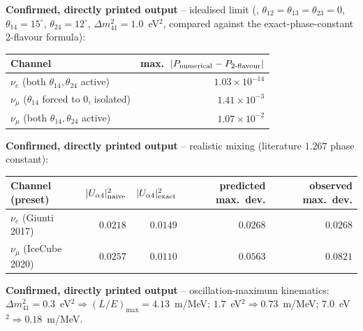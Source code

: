 \begin{resultbox}
\textbf{Confirmed, directly printed output} -- idealised limit
(, $\theta_{12}=\theta_{13}=\theta_{23}=0$,
$\theta_{14}=15^\circ$, $\theta_{24}=12^\circ$, $\Delta m^2_{41}=1.0$~eV$^2$,
compared against the exact-phase-constant 2-flavour formula):
\begin{center}
\small
\begin{tabular}{@{}lr@{}}
\toprule
Channel & max.\ $|P_{\rm numerical}-P_{\rm 2\text{-}flavour}|$ \\
\midrule
$\nu_e$ (both $\theta_{14},\theta_{24}$ active) & $1.03\times10^{-14}$ \\
$\nu_\mu$ ($\theta_{14}$ forced to $0$, isolated) & $1.41\times10^{-3}$ \\
$\nu_\mu$ (both $\theta_{14},\theta_{24}$ active) & $1.07\times10^{-2}$ \\
\bottomrule
\end{tabular}
\end{center}

\textbf{Confirmed, directly printed output} -- realistic mixing (literature
$1.267$ phase constant):
\begin{center}
\small
\begin{tabular}{@{}lrrrr@{}}
\toprule
Channel (preset) & $|U_{\alpha4}|^2_{\rm naive}$ & $|U_{\alpha4}|^2_{\rm exact}$ & predicted max.\ dev. & observed max.\ dev. \\
\midrule
$\nu_e$ (Giunti 2017) & $0.0218$ & $0.0149$ & $0.0268$ & $0.0268$ \\
$\nu_\mu$ (IceCube 2020) & $0.0257$ & $0.0110$ & $0.0563$ & $0.0821$ \\
\bottomrule
\end{tabular}
\end{center}

\textbf{Confirmed, directly printed output} -- oscillation-maximum
kinematics: $\Delta m^2_{41}=0.3$~eV$^2\Rightarrow(L/E)_{\max}=4.13$~m/MeV;
$1.7$~eV$^2\Rightarrow0.73$~m/MeV; $7.0$~eV$^2\Rightarrow0.18$~m/MeV.
\end{resultbox}


